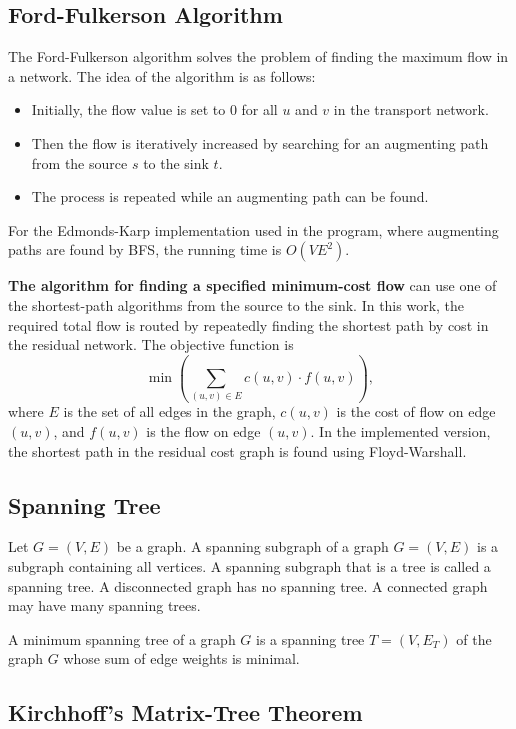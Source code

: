 \documentclass[a4paper,final]{article}
\begin{document}
	\subsection{Ford-Fulkerson Algorithm}

The Ford-Fulkerson algorithm solves the problem of finding the maximum flow in a network. The idea of the algorithm is as follows:

\begin{itemize}
  \item Initially, the flow value is set to 0 for all $u$ and $v$ in the transport network.
  \item Then the flow is iteratively increased by searching for an augmenting path from the source $s$ to the sink $t$.
  \item The process is repeated while an augmenting path can be found.
\end{itemize}

For the Edmonds-Karp implementation used in the program, where augmenting paths are found by BFS, the running time is $O(VE^2)$.

\medskip
\noindent\textbf{The algorithm for finding a specified minimum-cost flow} can use one of the shortest-path algorithms from the source to the sink. In this work, the required total flow is routed by repeatedly finding the shortest path by cost in the residual network. The objective function is
\[
\min\!\left(\sum_{(u,v)\in E} c(u,v)\cdot f(u,v)\right),
\]
where $E$ is the set of all edges in the graph, $c(u,v)$ is the cost of flow on edge $(u,v)$, and $f(u,v)$ is the flow on edge $(u,v)$. In the implemented version, the shortest path in the residual cost graph is found using Floyd-Warshall.

	\subsection{Spanning Tree}

Let $G = (V, E)$ be a graph. A spanning subgraph of a graph $G = (V, E)$ is a subgraph containing all vertices. A spanning subgraph that is a tree is called a spanning tree. A disconnected graph has no spanning tree. A connected graph may have many spanning trees.

A minimum spanning tree of a graph $G$ is a spanning tree $T = (V, E_T)$ of the graph $G$ whose sum of edge weights is minimal.

	\subsection{Kirchhoff's Matrix-Tree Theorem}
\end{document}
